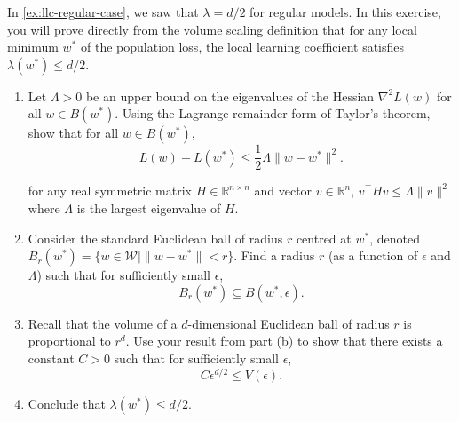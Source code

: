 \documentclass[11pt]{article}
\newcommand{\R}{\mathbb{R}}
\newcommand{\W}{\mathcal{W}}
\begin{document}
\begin{exercise}
\label{ex:lambda-upper-bound}
    In \cref{ex:llc-regular-case}, we saw that $\lambda = d/2$ for regular models. In this exercise, you will prove directly from the volume scaling definition that for any local minimum $w^*$ of the population loss, the local learning coefficient satisfies $\lambda(w^*) \leq d/2$.

    \begin{enumerate}
        \item 
             Let $\Lambda>0$ be an upper bound on the eigenvalues of the Hessian $\nabla^2 L(w)$ for all $w \in B(w^*)$. Using the Lagrange remainder form of Taylor's theorem, show that for all $w \in B(w^*)$,
            \begin{equation*}
                L(w) - L(w^*) \leq \frac{1}{2} \Lambda \|w - w^*\|^2.
            \end{equation*}
            \begin{hint}
for any real symmetric matrix $H\in\R^{n\times n}$ and vector $v\in \R^n$, $v^\top H v \leq \Lambda  \|v\|^2$ where $\Lambda$ is the largest eigenvalue of $H$.
            \end{hint}
            
        \item 
            Consider the standard Euclidean ball of radius $r$ centred at $w^*$, denoted $B_r(w^*) = \{w \in \W \mid \|w - w^*\| < r\}$. Find a radius $r$ (as a function of $\epsilon$ and $\Lambda$) such that for sufficiently small $\epsilon$,
            \begin{equation*}
                B_r(w^*) \subseteq B(w^*, \epsilon).
            \end{equation*}
            
        \item 
            Recall that the volume of a $d$-dimensional Euclidean ball of radius $r$ is proportional to $r^d$. Use your result from part (b) to show that there exists a constant $C > 0$ such that for sufficiently small $\epsilon$,
            \begin{equation*}
                  C \epsilon^{d/2} \leq V(\epsilon).
            \end{equation*}
            
        \item 
            Conclude that $\lambda(w^*) \leq d/2$. 
    \end{enumerate} 
    
\end{exercise}
\end{document}
